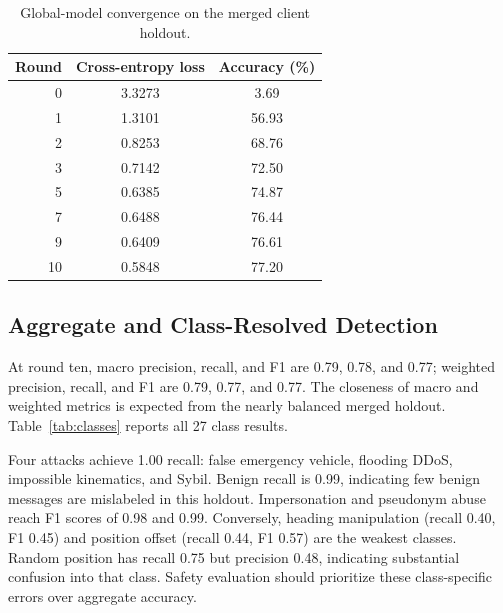 \documentclass[journal]{IEEEtran}
\begin{document}
\begin{table}[t]
\centering
\caption{Global-model convergence on the merged client holdout.}
\label{tab:convergence}
\begin{tabular}{rcc}
\toprule
Round & Cross-entropy loss & Accuracy (\%) \\
\midrule
0 & 3.3273 & 3.69 \\
1 & 1.3101 & 56.93 \\
2 & 0.8253 & 68.76 \\
3 & 0.7142 & 72.50 \\
5 & 0.6385 & 74.87 \\
7 & 0.6488 & 76.44 \\
9 & 0.6409 & 76.61 \\
10 & 0.5848 & 77.20 \\
\bottomrule
\end{tabular}
\end{table}

\subsection{Aggregate and Class-Resolved Detection}
At round ten, macro precision, recall, and F1 are 0.79, 0.78, and 0.77; weighted precision, recall, and F1 are 0.79, 0.77, and 0.77. The closeness of macro and weighted metrics is expected from the nearly balanced merged holdout. Table~\ref{tab:classes} reports all 27 class results.

Four attacks achieve 1.00 recall: false emergency vehicle, flooding DDoS, impossible kinematics, and Sybil. Benign recall is 0.99, indicating few benign messages are mislabeled in this holdout. Impersonation and pseudonym abuse reach F1 scores of 0.98 and 0.99. Conversely, heading manipulation (recall 0.40, F1 0.45) and position offset (recall 0.44, F1 0.57) are the weakest classes. Random position has recall 0.75 but precision 0.48, indicating substantial confusion into that class. Safety evaluation should prioritize these class-specific errors over aggregate accuracy.
\end{document}
